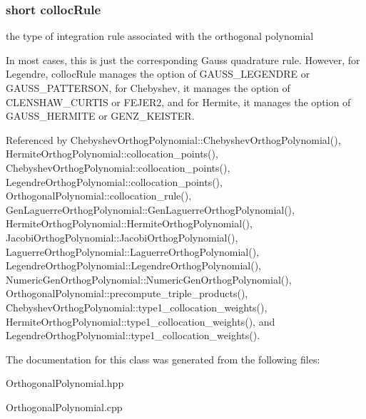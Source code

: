 \subsubsection[{\texorpdfstring{colloc\+Rule}{collocRule}}]{\setlength{\rightskip}{0pt plus 5cm}short colloc\+Rule\hspace{0.3cm}{\ttfamily [protected]}}\label{classPecos_1_1OrthogonalPolynomial_abcc1d84cc8e8c8b5a66f720067039f2e}


the type of integration rule associated with the orthogonal polynomial 

In most cases, this is just the corresponding Gauss quadrature rule. However, for Legendre, colloc\+Rule manages the option of G\+A\+U\+S\+S\+\_\+\+L\+E\+G\+E\+N\+D\+RE or G\+A\+U\+S\+S\+\_\+\+P\+A\+T\+T\+E\+R\+S\+ON, for Chebyshev, it manages the option of C\+L\+E\+N\+S\+H\+A\+W\+\_\+\+C\+U\+R\+T\+IS or F\+E\+J\+E\+R2, and for Hermite, it manages the option of G\+A\+U\+S\+S\+\_\+\+H\+E\+R\+M\+I\+TE or G\+E\+N\+Z\+\_\+\+K\+E\+I\+S\+T\+ER. 

Referenced by Chebyshev\+Orthog\+Polynomial\+::\+Chebyshev\+Orthog\+Polynomial(), Hermite\+Orthog\+Polynomial\+::collocation\+\_\+points(), Chebyshev\+Orthog\+Polynomial\+::collocation\+\_\+points(), Legendre\+Orthog\+Polynomial\+::collocation\+\_\+points(), Orthogonal\+Polynomial\+::collocation\+\_\+rule(), Gen\+Laguerre\+Orthog\+Polynomial\+::\+Gen\+Laguerre\+Orthog\+Polynomial(), Hermite\+Orthog\+Polynomial\+::\+Hermite\+Orthog\+Polynomial(), Jacobi\+Orthog\+Polynomial\+::\+Jacobi\+Orthog\+Polynomial(), Laguerre\+Orthog\+Polynomial\+::\+Laguerre\+Orthog\+Polynomial(), Legendre\+Orthog\+Polynomial\+::\+Legendre\+Orthog\+Polynomial(), Numeric\+Gen\+Orthog\+Polynomial\+::\+Numeric\+Gen\+Orthog\+Polynomial(), Orthogonal\+Polynomial\+::precompute\+\_\+triple\+\_\+products(), Chebyshev\+Orthog\+Polynomial\+::type1\+\_\+collocation\+\_\+weights(), Hermite\+Orthog\+Polynomial\+::type1\+\_\+collocation\+\_\+weights(), and Legendre\+Orthog\+Polynomial\+::type1\+\_\+collocation\+\_\+weights().



The documentation for this class was generated from the following files\+:\begin{DoxyCompactItemize}
\item 
Orthogonal\+Polynomial.\+hpp\item 
Orthogonal\+Polynomial.\+cpp\end{DoxyCompactItemize}
